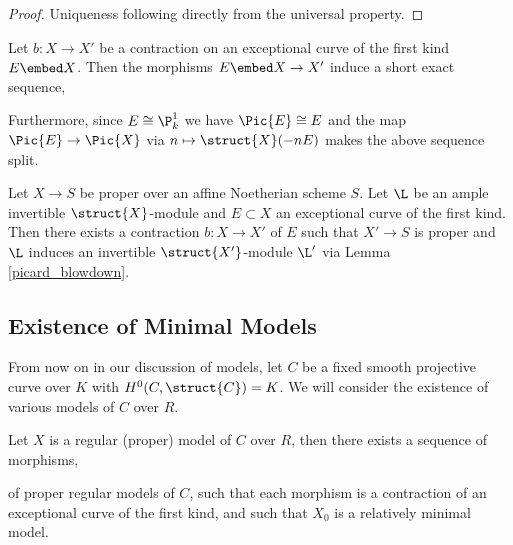 \begin{proof}
Uniqueness following directly from the universal property.
\end{proof}


\begin{prop} \label{picard_blowdown}
Let $b : X \to X'$ be a contraction on an exceptional curve of the first kind $E \embed X$. Then the morphisms $E \embed X \to X'$ induce a short exact sequence,
\begin{center}
\end{center}
Furthermore, since $E \cong \P^1_k$ we have $\Pic{E} \cong E$ and the map $\Pic{E} \to \Pic{X}$ via $n \mapsto \struct{X}(-n E)$ makes the above sequence split. 
\end{prop}

\begin{prop} \label{existence_of_blowdown}
Let $X \to S$ be proper over an affine Noetherian scheme $S$. Let $\L$ be an ample invertible $\struct{X}$-module and $E \subset X$ an exceptional curve of the first kind. Then there exists a contraction $b : X \to X'$ of $E$ such that $X' \to S$ is proper and $\L$ induces an invertible $\struct{X'}$-module $\L'$ via Lemma \ref{picard_blowdown}. 
\end{prop}


\subsection{Existence of Minimal Models}

From now on in our discussion of models, let $C$ be a fixed smooth projective curve over $K$ with $H^0(C, \struct{C}) = K$. We will consider the existence of various models of $C$ over $R$. 

\begin{lemma} \label{blow_down_chains}
Let $X$ is a regular (proper) model of $C$ over $R$, then there exists a sequence of morphisms,
\begin{center}
\end{center}
of proper regular models of $C$, such that each morphism is a contraction of an exceptional curve of the first kind, and such that $X_0$ is a relatively minimal model.
\end{lemma}

